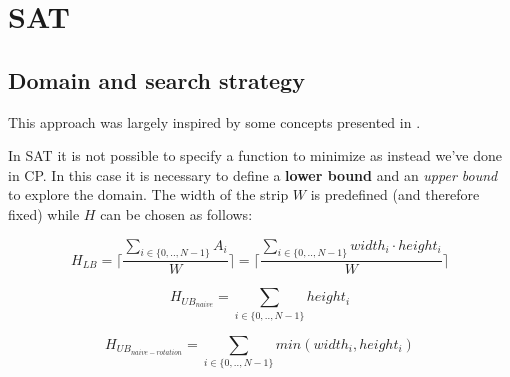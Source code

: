 \chapter{SAT}

\section{Domain and search strategy}

This approach was largely inspired by some concepts presented in \cite{example_book}.

In SAT it is not possible to specify a function to minimize as instead we've done in CP. In this case it is necessary to define a \textbf{lower bound} and an \textit{upper bound} to explore the domain. The width of the strip $W$ is predefined (and therefore fixed) while $H$ can be chosen as follows:

$$H_{LB} = \lceil \frac{\sum_{i \in \{0, .., N-1\}}{A_{i}}}{W} \rceil =\lceil \frac{\sum_{i \in \{0, .., N-1\}}{width_{i} \cdot height_{i}}}{W} \rceil$$

$$H_{{UB}_{naive}} = \sum_{i \in \{0, .., N-1\}} height_i$$

$$H_{{UB}_{naive-rotation}} = \sum_{i \in \{0, .., N-1\}}{min({width_i, height_i})}$$

